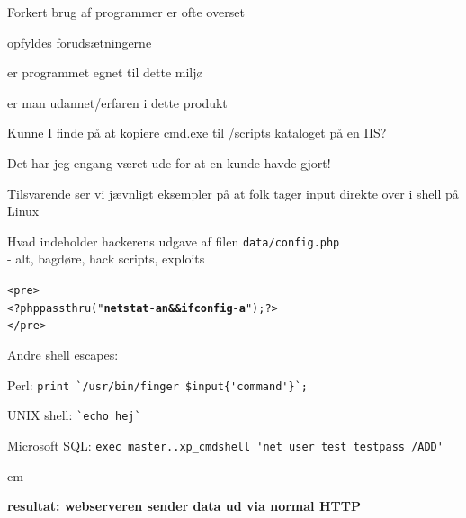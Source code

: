 \documentclass[Screen16to9,17pt]{foils}
\begin{document}
\begin{list1}
\item Forkert brug af programmer er ofte overset
\begin{list2}
\item opfyldes forudsætningerne
\item er programmet egnet til dette miljø
\item er man udannet/erfaren i dette produkt
\end{list2}
\item Kunne I finde på at kopiere cmd.exe til
/scripts kataloget på en IIS?
\item Det har jeg engang været ude for at en kunde havde gjort!
\item Tilsvarende ser vi jævnligt eksempler på at folk tager input direkte over i shell på Linux
\end{list1}


\begin{list1}
\item Hvad indeholder hackerens udgave af filen \verb+data/config.php+ \\
- alt, bagdøre, hack scripts, exploits
\end{list1}
\begin{alltt}
<pre>
<?php passthru("{\bfseries netstat -an && ifconfig -a}"); ?>
</pre>
\end{alltt}
\begin{list1}
\item Andre shell escapes:
\begin{list2}
\item Perl: \verb+print `/usr/bin/finger $input{'command'}`;+
\item UNIX shell: \verb+`echo hej`+
\item Microsoft SQL: \verb+exec master..xp_cmdshell 'net user test testpass /ADD'+
\end{list2}
\end{list1}

 cm

\centerline{\bfseries resultat: webserveren sender data ud via normal HTTP}





\centerline{}
\end{document}
